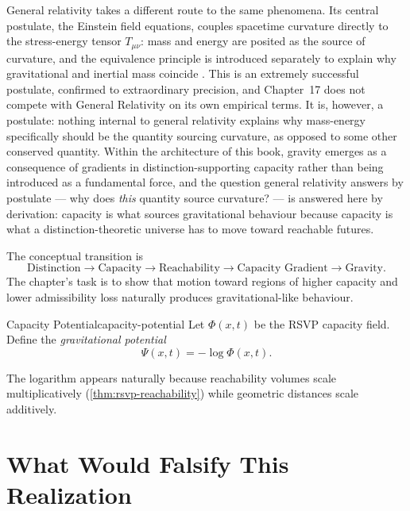 \documentclass[12pt,twoside,openright]{book}
\begin{document}
General relativity takes a different route to the same
phenomena. Its central postulate, the Einstein field
equations, couples spacetime curvature directly to the
stress-energy tensor $T_{\mu\nu}$: mass and energy are
posited as the source of curvature, and the equivalence
principle is introduced separately to explain why
gravitational and inertial mass coincide
\parencite{misner1973}. This is an extremely successful
postulate, confirmed to extraordinary precision, and Chapter~17
does not compete with General Relativity on its own
empirical terms. It is, however, a postulate: nothing internal
to general relativity explains why mass-energy specifically
should be the quantity sourcing curvature, as opposed to some
other conserved quantity. Within the architecture of this
book, gravity emerges as a consequence of gradients in
distinction-supporting capacity rather than being introduced
as a fundamental force, and the question general relativity
answers by postulate --- why does \emph{this} quantity source
curvature? --- is answered here by derivation: capacity is
what sources gravitational behaviour because capacity is what
a distinction-theoretic universe has to move toward reachable
futures.

The conceptual transition is
\[
  \text{Distinction} \to \text{Capacity} \to \text{Reachability}
  \to \text{Capacity Gradient} \to \text{Gravity}.
\]
The chapter's task is to show that motion toward regions of
higher capacity and lower admissibility loss naturally
produces gravitational-like behaviour.

\begin{definition}{Capacity Potential}{capacity-potential}
  Let $\Phi(x,t)$ be the RSVP capacity field. Define the
  \emph{gravitational potential}
  \[
    \Psi(x,t) = -\log \Phi(x,t).
  \]
\end{definition}

The logarithm appears naturally because reachability
volumes scale multiplicatively (\cref{thm:rsvp-reachability})
while geometric distances scale additively.

\section{What Would Falsify This Realization}
\label{sec:ch17-falsifiability}
\end{document}
